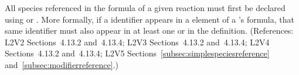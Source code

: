 All species referenced in the \StoichiometryMath formula of a given
reaction must first be declared using \SpeciesReference or
\ModifierSpeciesReference.  More formally, if a \Species identifier appears
in a  element of a \Reaction's \StoichiometryMath formula, that
same identifier must also appear in at least one \SpeciesReference or
\ModifierSpeciesReference in the \Reaction definition.  (References: L2V2
Sections~4.13.2 and~4.13.4; L2V3 Sections~4.13.2 and~4.13.4; L2V4 Sections~4.13.2 and~4.13.4; L2V5 Sections~\ref{subsec:simplespeciesreference}
and~\ref{subsec:modifierreference}.)
